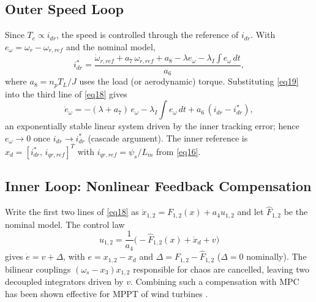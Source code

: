 \documentclass[conference]{IEEEtran}
\begin{document}
\subsection{Outer Speed Loop}
Since $T_{e}\propto i_{dr}$, the speed is controlled through the reference of $i_{dr}$. With $e_{\omega}=\omega_{r}-\omega_{r,ref}$ and the nominal model,
\begin{equation}
i^{\ast}_{dr}=\frac{\dot\omega_{r,ref}+a_{7}\,\omega_{r,ref}+a_{8}-\lambda e_{\omega}-\lambda_{I}\!\int\! e_{\omega}\,dt}{a_{6}},
\label{eq19}
\end{equation}
where $a_{8}=n_{p}T_{L}/J$ uses the load (or aerodynamic) torque. Substituting \eqref{eq19} into the third line of \eqref{eq18} gives
\[
\dot e_{\omega}=-(\lambda+a_{7})\,e_{\omega}-\lambda_{I}\!\int\! e_{\omega}\,dt+a_{6}\,(i_{dr}-i^{\ast}_{dr}),
\]
an exponentially stable linear system driven by the inner tracking error; hence $e_{\omega}\to0$ once $i_{dr}\to i^{\ast}_{dr}$ (cascade argument). The inner reference is $x_{d}=[i^{\ast}_{dr},\,i_{qr,ref}]^{T}$ with $i_{qr,ref}=\psi_{s}/L_{m}$ from \eqref{eq16}.

\subsection{Inner Loop: Nonlinear Feedback Compensation}
Write the first two lines of \eqref{eq18} as $\dot x_{1,2}=F_{1,2}(x)+a_{4}u_{1,2}$ and let $\hat F_{1,2}$ be the nominal model. The control law
\begin{equation}
u_{1,2}=\frac{1}{a_{4}}\Big(-\hat F_{1,2}(x)+\dot x_{d}+v\Big)
\label{eq20}
\end{equation}
gives $\dot e=v+\Delta$, with $e=x_{1,2}-x_{d}$ and $\Delta=F_{1,2}-\hat F_{1,2}$ ($\Delta=0$ nominally). The bilinear couplings $(\omega_{s}-x_{3})x_{1,2}$ responsible for chaos are cancelled, leaving two decoupled integrators driven by $v$. Combining such a compensation with MPC has been shown effective for MPPT of wind turbines \cite{b34}.
\end{document}
